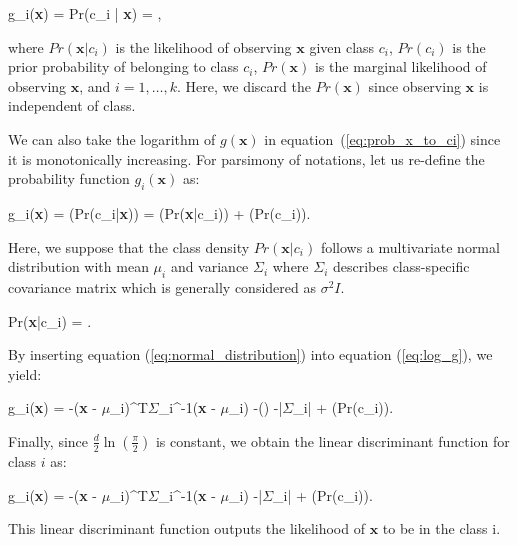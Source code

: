 \be
    \label{eq:prob_x_to_ci}
    g_{i}(\textbf{x}) = Pr(c_{i} | \textbf{x}) = , 
\ee

where $Pr(\textbf{x}|c_{i})$ is the likelihood of observing $\textbf{x}$ given class $c_{i}$, $Pr(c_{i})$ is the prior probability of belonging to class $c_{i}$, $Pr(\textbf{x})$ is the marginal likelihood of observing $\textbf{x}$, and $i = 1, \dots, k$. Here, we discard the $Pr(\textbf{x})$ since observing $\textbf{x}$ is independent of class.

We can also take the logarithm of $g(\textbf{x})$ in equation~(\ref{eq:prob_x_to_ci}) since it is monotonically increasing. For parsimony of notations, let us re-define the probability function $g_{i}(\textbf{x})$ as:

\be
\label{eq:log_g}
g_{i}(\textbf{x}) = \ln(Pr(c_{i}|\textbf{x})) = \ln(Pr(\textbf{x}|c_{i})) + \ln(Pr(c_{i}))\:.
\ee

Here, we suppose that the class density $Pr(\textbf{x}|c_{i})$ follows a multivariate normal distribution with mean $\textbf{$\mu$}_{i}$ and variance $\textbf{$\Sigma$}_{i}$ where $\textbf{$\Sigma$}_{i}$ describes class-specific covariance matrix which is generally considered as $\sigma^{2}I$.

\be
\label{eq:normal_distribution}
Pr(\textbf{x}|c_{i}) =  \exp {}.
\ee

By inserting equation (\ref{eq:normal_distribution}) into equation (\ref{eq:log_g}), we yield:

\be
\label{eq:prior_linear_disc_func}
g_{i}(\textbf{x}) = -(\textbf{x} - \textbf{$\mu$}_{i})^{T}{\textbf{$\Sigma$}_{i}}^{-1}(\textbf{x} - \textbf{$\mu$}_{i}) -\ln() -\ln|\textbf{$\Sigma$}_{i}| + \ln(Pr(c_{i}))\:.
\ee

Finally, since $\frac{d}{2}\ln(\frac{\pi}{2})$ is constant, we obtain the linear discriminant function for class $i$ as:

\be
\label{eq:linear_disc_func}
g_{i}(\textbf{x}) = -(\textbf{x} - \textbf{$\mu$}_{i})^{T}{\textbf{$\Sigma$}_{i}}^{-1}(\textbf{x} - \textbf{$\mu$}_{i}) -\ln|\textbf{$\Sigma$}_{i}| + \ln(Pr(c_{i}))\:.
\ee

This linear discriminant function outputs the likelihood of $\textbf{x}$ to be in the class {i}.

